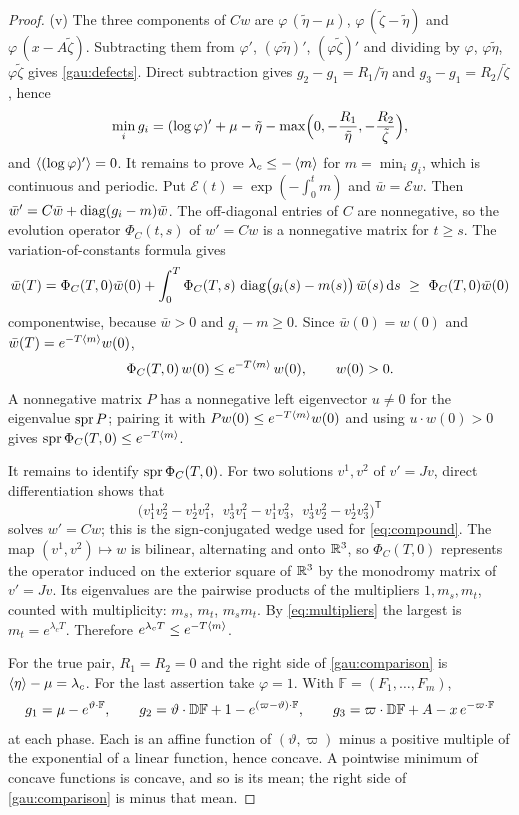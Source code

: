 \begin{proof}
(v) The three components of $Cw$ are $\varphi\,(\tilde\eta-\mu)$, $\varphi\,(\tilde\zeta-\tilde\eta)$ and $\varphi\,(x-A\tilde\zeta)$. Subtracting them from $\varphi'$, $(\varphi\tilde\eta)'$, $(\varphi\tilde\zeta)'$ and dividing by $\varphi$, $\varphi\tilde\eta$, $\varphi\tilde\zeta$ gives \eqref{gau:defects}. Direct subtraction gives $g_2-g_1=R_1/\tilde\eta$ and $g_3-g_1=R_2/\tilde\zeta$, hence
\[
\min_ig_i=(\log\varphi)'+\mu-\tilde\eta-\max\Bigl(0,-\frac{R_1}{\tilde\eta},-\frac{R_2}{\tilde\zeta}\Bigr),
\]
and $\left\langle (\log\varphi)'\right\rangle=0$. It remains to prove $\lambda_c\le-\left\langle m\right\rangle$ for $m=\min_ig_i$, which is continuous and periodic. Put $\mathcal E(t)=\exp(-\int_0^tm)$ and $\bar w=\mathcal Ew$. Then $\bar w'=C\bar w+\operatorname{diag}(g_i-m)\bar w$. The off-diagonal entries of $C$ are nonnegative, so the evolution operator $\Phi_C(t,s)$ of $w'=Cw$ is a nonnegative matrix for $t\ge s$. The variation-of-constants formula gives
\[
\bar w(T)=\Phi_C(T,0)\bar w(0)+\int_0^T\Phi_C(T,s)\,\operatorname{diag}\bigl(g_i(s)-m(s)\bigr)\,\bar w(s)\,\mathrm ds\ \ge\ \Phi_C(T,0)\bar w(0)
\]
componentwise, because $\bar w>0$ and $g_i-m\ge0$. Since $\bar w(0)=w(0)$ and $\bar w(T)=e^{-T\left\langle m\right\rangle}w(0)$,
\[
\Phi_C(T,0)\,w(0)\le e^{-T\left\langle m\right\rangle}\,w(0),\qquad w(0)>0 .
\]
A nonnegative matrix $P$ has a nonnegative left eigenvector $u\ne0$ for the eigenvalue $\operatorname{spr} P$; pairing it with $Pw(0)\le e^{-T\left\langle m\right\rangle}w(0)$ and using $u\cdot w(0)>0$ gives $\operatorname{spr}\Phi_C(T,0)\le e^{-T\left\langle m\right\rangle}$.

It remains to identify $\operatorname{spr}\Phi_C(T,0)$. For two solutions $v^1,v^2$ of $v'=Jv$, direct differentiation shows that
\[
\bigl(v^1_1v^2_2-v^1_2v^2_1,\ \ v^1_3v^2_1-v^1_1v^2_3,\ \ v^1_3v^2_2-v^1_2v^2_3\bigr)^{\mathsf T}
\]
solves $w'=Cw$; this is the sign-conjugated wedge used for \eqref{eq:compound}. The map $(v^1,v^2)\mapsto w$ is bilinear, alternating and onto $\mathbb R^3$, so $\Phi_C(T,0)$ represents the operator induced on the exterior square of $\mathbb R^3$ by the monodromy matrix of $v'=Jv$. Its eigenvalues are the pairwise products of the multipliers $1,m_s,m_t$, counted with multiplicity: $m_s$, $m_t$, $m_sm_t$. By \eqref{eq:multipliers} the largest is $m_t=e^{\lambda_cT}$. Therefore $e^{\lambda_cT}\le e^{-T\left\langle m\right\rangle}$.

For the true pair, $R_1=R_2=0$ and the right side of \eqref{gau:comparison} is $\left\langle \eta\right\rangle-\mu=\lambda_c$. For the last assertion take $\varphi=1$. With $\mathbb F=(F_1,\dots,F_m)$,
\[
g_1=\mu-e^{\vartheta\cdot\mathbb F},\qquad
g_2=\vartheta\cdot\mathbb D\mathbb F+1-e^{(\varpi-\vartheta)\cdot\mathbb F},\qquad
g_3=\varpi\cdot\mathbb D\mathbb F+A-x\,e^{-\varpi\cdot\mathbb F}
\]
at each phase. Each is an affine function of $(\vartheta,\varpi)$ minus a positive multiple of the exponential of a linear function, hence concave. A pointwise minimum of concave functions is concave, and so is its mean; the right side of \eqref{gau:comparison} is minus that mean.
\end{proof}

